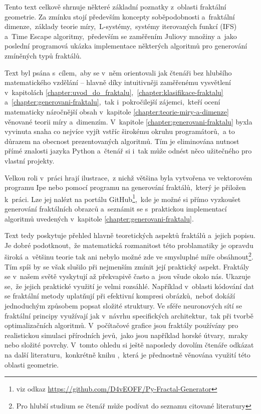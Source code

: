 
Tento text celkově shrnuje některé základní poznatky z~oblasti fraktální geometrie. Za zmínku stojí především koncepty soběpodobnosti a~fraktální dimenze,~základy teorie míry,~L-systémy,~systémy iterovaných funkcí (IFS) a~Time Escape algoritmy,~především se zaměřením Juliovy množiny a~jako poslední programová ukázka implementace některých algoritmů pro generování zmíněných typů fraktálů.

Text byl psána s~cílem,~aby se v~něm orientovali jak čtenáři bez hlubšího matematického vzdělání -- hlavně díky intuitivněji zaměřenému vysvětlení v~kapitolách \ref{chapter:uvod_do_fraktalu},~\ref{chapter:klasifikace-fraktalu} a~\ref{chapter:generovani-fraktalu},~tak i~pokročilejší zájemci,~kteří ocení matematicky náročnější obsah v~kapitole \ref{chapter:teorie-miry-a-dimenze} věnované teorii míry a~dimenzím. V~kapitole \ref{chapter:generovani-fraktalu} byxla vyvinuta snaha co nejvíce vyjít vstříc širokému okruhu programátorů,~a to důrazem na obecnost prezentovaných algoritmů. Tím je eliminována nutnost přímé znalosti jazyka Python a~čtenář si i~tak může odnést něco užitečného pro vlastní projekty.

Velkou roli v~práci hrají ilustrace,~z nichž většina byla vytvořena ve vektorovém programu Ipe nebo pomocí programu na generování fraktálů,~který je přiložen k~práci. Lze jej nalézt na portálu GitHub\footnote{viz odkaz \url{https://github.com/D4vEOFF/Py-Fractal-Generator}},~kde je možné si přímo vyzkoušet generování fraktálních obrazců a~seznámit se s~praktickou implementací algoritmů uvedených v~kapitole \ref{chapter:generovani-fraktalu}.

Text tedy poskytuje přehled hlavně teoretických aspektů fraktálů a~jejich popisu. Je dobré podotknout,~že matematická rozmanitost této problamatiky je opravdu široká a~většinu teorie tak ani nebylo možné zde ve smysluplné míře obsáhnout\footnote{Pro hlubší studium se čtenář může podívat do seznamu citované literatury}. Tím spíš by se však slušilo při nejmenším zmínit její praktický aspekt. Fraktály se v~našem světě vyskytují až překvapivě často a~jsou všude okolo nás. Ukazuje se,~že jejich praktické využití je velmi rozsáhlé. Například v~oblasti kódování dat se fraktální metody uplatňují při efektivní kompresi obrázků,~neboť dokáží jednoduchým způsobem popsat složité struktury. Ve sféře neuronových sítí se fraktální principy využívají jak v~návrhu specifických architektur,~tak při tvorbě optimalizačních algoritmů. V~počítačové grafice jsou fraktály používány pro realistickou simulaci přírodních jevů,~jako jsou například horské útvary,~mraky nebo složité povrchy. V~tomto ohledu si ještě naposledy dovolím čtenáře odkázat na další literaturu,~konkrétně knihu \cite{Zelinka2006},~která je přednostně věnována využití této oblasti geometrie.

